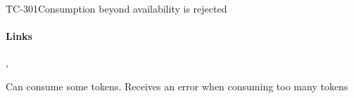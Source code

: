 \begin{testcase}{TC-301}{Consumption beyond availability is rejected}
\label{TC-301}
\paragraph{Links} , 

\begin{testprocedure}
    \stage Can consume some tokens.
    \stage Receives an error when consuming too many tokens
\end{testprocedure}
\end{testcase}
